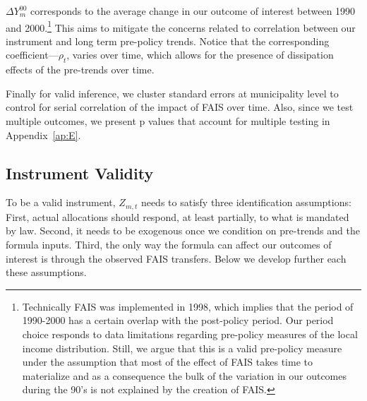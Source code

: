 \documentclass[dv_diss_main.tex]{subfiles}
\begin{document}
 $\Delta Y_m^{00}$  corresponds to the average change in our outcome of interest between 1990 and 2000.\footnote{Technically FAIS was implemented in 1998, which implies that the period of 1990-2000 has a certain overlap with the post-policy period. Our period choice responds to data limitations regarding pre-policy measures of the local income distribution. Still, we argue that this is a valid pre-policy measure under the assumption that most of the effect of FAIS takes time to materialize and as a consequence the bulk of the variation in our outcomes during the 90’s is not explained by the creation of FAIS.}
 This aims to mitigate the concerns related to correlation between our instrument and long term pre-policy trends. Notice that the corresponding  coefficient---$\rho_t$, varies over time, which allows for the presence of dissipation effects of the pre-trends over time. 


Finally for valid inference, we cluster standard errors at municipality level to control for serial correlation of the impact of FAIS over time. Also, since we test multiple outcomes, we present p values that account for multiple testing in Appendix~\ref{ap:E}. 

\subsection{Instrument Validity} \label{subsec:validity}

To be a valid instrument, $Z_{m,t}$ needs to satisfy three identification assumptions: First, actual allocations should respond, at least partially, to what is mandated by law. Second, it needs to be exogenous once we condition on pre-trends and the formula inputs. Third, the only way the formula can affect our outcomes of interest is through the observed FAIS transfers. Below we develop further each these assumptions.
\end{document}
